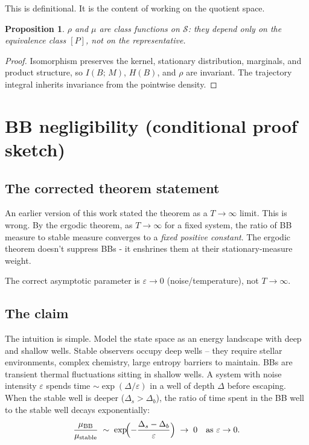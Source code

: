 \documentclass[12pt]{article}
\newtheorem{proposition}[theorem]{Proposition}
\theoremstyle{remark}
\begin{document}
This is definitional. It is the content of working on the quotient space.

\begin{proposition}
$\rho$ and $\mu$ are class functions on $\mathcal{S}$: they depend only on the equivalence class $[P]$, not on the representative.
\end{proposition}
\begin{proof}
Isomorphism preserves the kernel, stationary distribution, marginals, and product structure, so $I(B;\,M)$, $H(B)$, and $\rho$ are invariant. The trajectory integral inherits invariance from the pointwise density.
\end{proof}



\section{BB negligibility (conditional proof sketch)}\label{sec:BB}

\subsection{The corrected theorem statement}

An earlier version of this work stated the theorem as a $T \to \infty$ limit. This is wrong. By the ergodic theorem, as $T \to \infty$ for a fixed system, the ratio of BB measure to stable measure converges to a \emph{fixed positive constant}. The ergodic theorem doesn't suppress BBs - it enshrines them at their stationary-measure weight.

The correct asymptotic parameter is $\varepsilon \to 0$ (noise/temperature), not $T \to \infty$.

\subsection{The claim}

The intuition is simple. Model the state space as an energy landscape with deep and shallow wells. Stable observers occupy deep wells -- they require stellar environments, complex chemistry, large entropy barriers to maintain. BBs are transient thermal fluctuations sitting in shallow wells. A system with noise intensity $\varepsilon$ spends time $\sim \exp(\Delta/\varepsilon)$ in a well of depth $\Delta$ before escaping. When the stable well is deeper ($\Delta_s > \Delta_b$), the ratio of time spent in the BB well to the stable well decays exponentially:
\begin{equation}\label{eq:thmA}
  \frac{\mu_{\mathrm{BB}}}{\mu_{\mathrm{stable}}} \;\sim\; \exp\!\Bigl(-\frac{\Delta_s - \Delta_b}{\varepsilon}\Bigr) \;\to\; 0 \quad \text{as } \varepsilon \to 0.
\end{equation}
\end{document}
